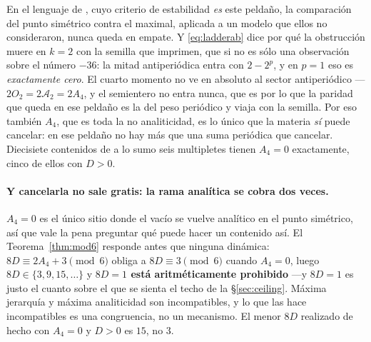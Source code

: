 \documentclass[11pt,a4paper]{article}
\begin{document}
En el lenguaje de \cite{CCD24}, cuyo criterio de estabilidad \emph{es} este peldaño, la comparación
del punto simétrico contra el maximal, aplicada a un modelo que ellos no consideraron, nunca queda
en empate. Y \eqref{eq:ladderab} dice por qué la obstrucción muere en $k=2$ con la semilla que
\cite{KM25} imprimen, que si no es sólo una
observación sobre el número $-36$: la mitad antiperiódica entra con $2-2^{p}$, y en $p=1$ eso es
\emph{exactamente cero}. El cuarto momento no ve en absoluto al sector antiperiódico ---$2O_2=2\mathcal{A}_2=2A_4$,
y el semientero no entra nunca, que es por lo que la paridad que queda en ese peldaño es la del peso
periódico y viaja con la semilla. Por eso también $A_4$, que es toda la no analiticidad, es lo único
que la materia \emph{sí} puede cancelar: en ese peldaño no hay más que una suma periódica que
cancelar. Diecisiete contenidos de a lo sumo seis multipletes tienen $A_4=0$ exactamente, cinco de
ellos con $D>0$.

\paragraph{Y cancelarla no sale gratis: la rama analítica se cobra dos veces.} $A_4=0$ es el único
sitio donde el vacío se vuelve analítico en el punto simétrico, así que vale la pena preguntar qué
puede hacer un contenido así. El Teorema~\ref{thm:mod6} responde antes que ninguna dinámica:
$8D\equiv 2A_4+3 \pmod 6$ obliga a $8D\equiv3\pmod6$ cuando $A_4=0$, luego $8D\in\{3,9,15,\dots\}$
y \textbf{$8D=1$ está aritméticamente prohibido} ---y $8D=1$ es justo el cuanto sobre el que se
sienta el techo de la \S\ref{sec:ceiling}. Máxima jerarquía y máxima analiticidad son
incompatibles, y lo que las hace incompatibles es una congruencia, no un mecanismo. El menor $8D$
realizado de hecho con $A_4=0$ y $D>0$ es $15$, no $3$.
\end{document}
